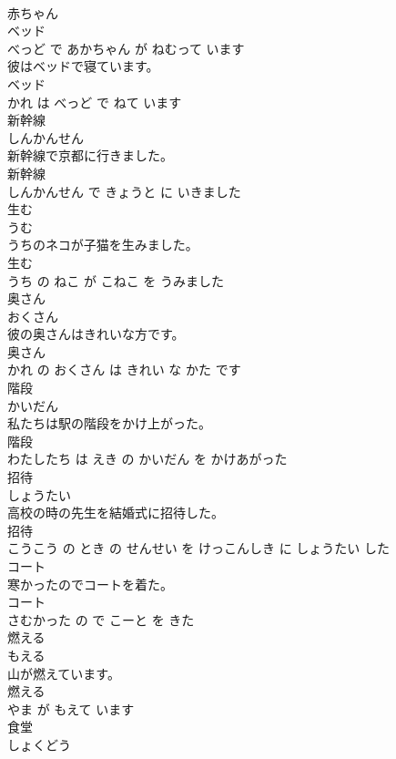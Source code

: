 \documentclass[8pt]{extreport}
\begin{document}
\begin{CJK}{UTF8}{min}
\\	赤ちゃん 
\\	ベッド 
\\	べっど で あかちゃん が ねむって います			
\\	彼はベッドで寝ています。	
\\	ベッド 
\\	かれ は べっど で ねて います			
\\	新幹線	
\\	しんかんせん			
\\	新幹線で京都に行きました。	
\\	新幹線 
\\	しんかんせん で きょうと に いきました			
\\	生む	
\\	うむ			
\\	うちのネコが子猫を生みました。	
\\	生む 
\\	うち の ねこ が こねこ を うみました			
\\	奥さん	
\\	おくさん			
\\	彼の奥さんはきれいな方です。	
\\	奥さん 
\\	かれ の おくさん は きれい な かた です			
\\	階段	
\\	かいだん			
\\	私たちは駅の階段をかけ上がった。	
\\	階段 
\\	わたしたち は えき の かいだん を かけあがった			
\\	招待	
\\	しょうたい			
\\	高校の時の先生を結婚式に招待した。	
\\	招待 
\\	こうこう の とき の せんせい を けっこんしき に しょうたい した			
\\	コート	
\\	寒かったのでコートを着た。	
\\	コート 
\\	さむかった の で こーと を きた			
\\	燃える	
\\	もえる			
\\	山が燃えています。	
\\	燃える 
\\	やま が もえて います			
\\	食堂	
\\	しょくどう			

\end{CJK}
\end{document}
